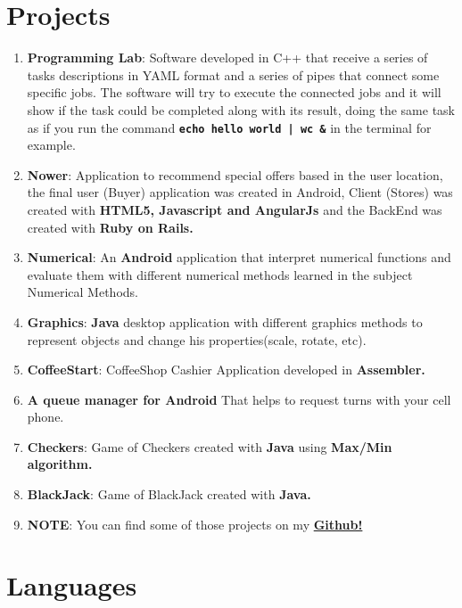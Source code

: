 \documentclass[a4paper,11pt]{article} %
\begin{document}
\section{Projects}
\begin{enumerate}
\item \textbf{Programming Lab}: Software developed in C++ that receive a series of tasks descriptions in YAML format and a series of pipes that connect some specific jobs. The software will try to execute the connected jobs and it will show if the task could be completed along with its result, doing the same task as if you run the command \textbf{\texttt{echo hello world | wc \&}} in the terminal for example.
\item \textbf{Nower}: Application to recommend special offers based in the user location, the final user (Buyer) application was created in Android, Client (Stores) was created with \textbf{HTML5, Javascript and AngularJs} and the BackEnd was created with \textbf{Ruby on Rails.}
\item \textbf{Numerical}: An \textbf{Android} application that interpret numerical functions and evaluate them with different numerical methods learned in the subject Numerical Methods.
\item \textbf{Graphics}: \textbf{Java} desktop application with different graphics methods to represent objects and change his properties(scale, rotate, etc).
\item \textbf{CoffeeStart}: CoffeeShop Cashier Application developed in \textbf{Assembler.}
\item \textbf{A queue manager for Android} That helps to request turns with your cell phone.
\item \textbf{Checkers}:  Game of Checkers created with \textbf{Java} using \textbf{Max/Min algorithm.}
\item \textbf{BlackJack}: Game of BlackJack created with \textbf{Java.}
\item \textbf{NOTE}: You can find some of those projects on my \href{https://github.com/EstebanFS}{\textbf{Github!}}
\end{enumerate}



\section{Languages}
\end{document}
